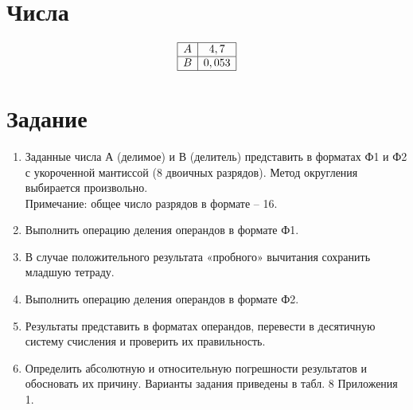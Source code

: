 \documentclass{article}
\begin{document}
\itmo[
       variant=111,
       labn=8,
       worktype=Домашняя работа,
       discipline=Дискретная математика,
       group=P3115,
       student=Владимир Мацюк,
       teacher=Поляков Владимир Иванович,
       logo=../../../lib/img/itmo.png
]

\newcommand{\car}{\multicolumn{1}{c@{\hspace*{\tabcolsep}\makebox[0pt]{\curvearrowleft}}}{}}
\newcommand{\rcar}{\multicolumn{1}{c@{\hspace*{\tabcolsep}\makebox[0pt]{\curvearrowright}}}{}}
\newcommand{\ncar}{\multicolumn{1}{c@{\hspace*{\tabcolsep}\makebox[0pt]{}}}{}}
\newcommand{\SPACE}{\multicolumn{12}{c}{}}
\newcommand{\INT}{\multicolumn{5}{c}{\MM{Интерпретации}}}
\newcommand{\PLUS}{\multirow{2}{*}{+}}
\newcommand{\MINUS}{\multirow{2}{*}{-}}
\newcommand{\SIGN}{\multicolumn{2}{c}{\MM{Знаковая}}}
\newcommand{\USIGN}{\multicolumn{2}{c}{\MM{Беззнаковая}}}

\section{Числа}
$$
       \begin{array}{|c|c|}
              \hline
              A & 4,7 \\\hline
              B & 0,053 \\\hline
       \end{array}
$$
\section{Задание}

\begin{enumerate}
       \item Заданные числа А (делимое) и В (делитель) представить в форматах Ф1 и Ф2 с укороченной мантиссой (8 двоичных разрядов). Метод округления выбирается произвольно.
       \\ Примечание: общее число разрядов в формате – 16.
       \item Выполнить операцию деления операндов в формате Ф1.
       \item В случае положительного результата «пробного» вычитания сохранить младшую тетраду.
       \item Выполнить операцию деления операндов в формате Ф2.
       \item Результаты представить в форматах операндов, перевести в десятичную систему счисления и проверить их правильность.
       \item Определить абсолютную и относительную погрешности результатов и обосновать их причину.
       Варианты задания приведены в табл. 8 Приложения 1.
       
             
\end{enumerate}
\end{document}
